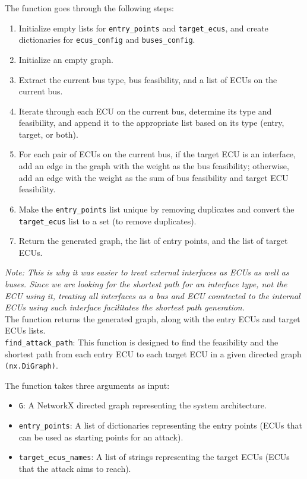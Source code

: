 The function goes through the following steps:
\begin{enumerate}
    \item Initialize empty lists for \texttt{entry\_points} and \texttt{target\_ecus}, 
        and create dictionaries for \texttt{ecus\_config} and \texttt{buses\_config}.
    \item Initialize an empty graph.
    \item Extract the current bus type, bus feasibility, and a list of ECUs on the current bus.
    \item Iterate through each ECU on the current bus, determine its type and feasibility, and append it to the 
        appropriate list based on its type (entry, target, or both).
    \item For each pair of ECUs on the current bus, if the target ECU is an interface, 
        add an edge in the graph with the weight as the bus feasibility; 
        otherwise, add an edge with the weight as the sum of bus feasibility and target ECU feasibility.
    \item Make the \texttt{entry\_points} list unique by removing duplicates and convert the \texttt{target\_ecus} list to a set (to remove duplicates).
    \item Return the generated graph, the list of entry points, and the list of target ECUs.
\end{enumerate}

\textit{Note: This is why it was easier to treat external interfaces as ECUs as well as buses.
Since we are looking for the shortest path for an interface type, not the ECU using it, treating all interfaces
as a bus and ECU conntected to the internal ECUs using such interface facilitates the shortest path generation.}\\
The function returns the generated graph, along with the entry ECUs and target ECUs lists.\\


\texttt{find\_attack\_path}: 
This function is designed to find the feasibility and the shortest path from each entry ECU 
to each target ECU in a given directed graph \texttt{(nx.DiGraph)}.

The function takes three arguments as input:
\begin{itemize}
    \item \texttt{G}: A NetworkX directed graph representing the system architecture.
    \item \texttt{entry\_points}: A list of dictionaries representing the entry points (ECUs that can be used as starting points for an attack).
    \item \texttt{target\_ecus\_names}: A list of strings representing the target ECUs (ECUs that the attack aims to reach).
\end{itemize}

